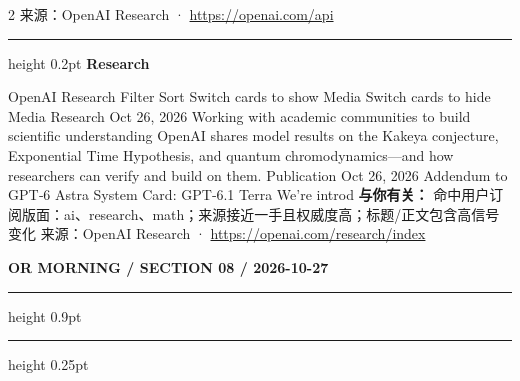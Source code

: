 \documentclass[10.5pt]{ctexart}
\begin{document}
\begin{multicols}{2}
{\footnotesize\color{ormuted} 来源：OpenAI Research · \url{https://openai.com/api}}
\vspace{2mm}
\hrule height 0.2pt
\vspace{2mm}
{\large\bfseries Research}\par
OpenAI Research Filter Sort Switch cards to show Media Switch cards to hide Media Research Oct 26, 2026 Working with academic communities to build scientific understanding OpenAI shares model results on the Kakeya conjecture, Exponential Time Hypothesis, and quantum chromodynamics—and how researchers can verify and build on them. Publication Oct 26, 2026 Addendum to GPT‑6 Astra System Card: GPT‑6.1 Terra We’re introd
\textbf{与你有关：} 命中用户订阅版面：ai、research、math；来源接近一手且权威度高；标题/正文包含高信号变化
{\footnotesize\color{ormuted} 来源：OpenAI Research · \url{https://openai.com/research/index}}
\end{multicols}
\newpage
{\small\bfseries OR MORNING / SECTION 08 / 2026-10-27}
\vspace{2mm}
\hrule height 0.9pt
\vspace{1.5mm}
\hrule height 0.25pt
\vspace{4mm}
\end{document}
